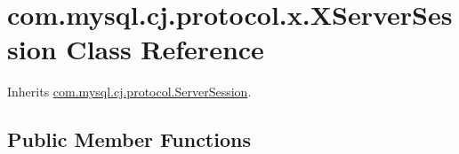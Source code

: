 \hypertarget{classcom_1_1mysql_1_1cj_1_1protocol_1_1x_1_1_x_server_session}{}\section{com.\+mysql.\+cj.\+protocol.\+x.\+X\+Server\+Session Class Reference}
\label{classcom_1_1mysql_1_1cj_1_1protocol_1_1x_1_1_x_server_session}


Inherits \mbox{\hyperlink{interfacecom_1_1mysql_1_1cj_1_1protocol_1_1_server_session}{com.\+mysql.\+cj.\+protocol.\+Server\+Session}}.

\subsection*{Public Member Functions}
